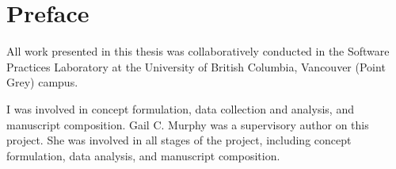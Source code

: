 
\chapter{Preface}

All work presented in this thesis was collaboratively conducted in the
Software Practices Laboratory at the University of British Columbia,
Vancouver (Point Grey) campus.

\par I was involved in concept formulation, 
data collection and analysis, and
manuscript composition.
Gail C. Murphy was a supervisory author on this project.
She was involved in all stages of the project, including
concept formulation,
data analysis, and
manuscript composition.

\endinput

TODO: revisit this after collaborating with JetBrains.
